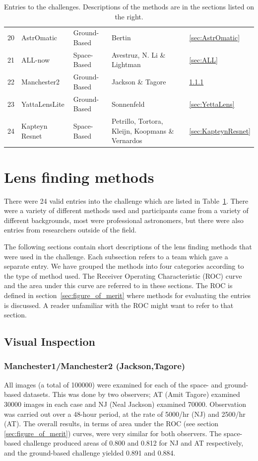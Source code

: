 \documentclass{aa}
\begin{document}
\begin{table}
\begin{tabular}{rllll}
  20 & AstrOmatic & Ground-Based & Bertin  & \ref{sec:AstrOmatic} \\ 
  21 & ALL-now & Space-Based & Avestruz, N. Li \& Lightman  & \ref{sec:ALL} \\ 
  22 & Manchester2 & Ground-Based & Jackson \& Tagore  & \ref{sec:manchester} \\ 
  23 & YattaLensLite & Ground-Based & Sonnenfeld  & \ref{sec:YettaLens} \\ 
  24 & Kapteyn Resnet & Space-Based & Petrillo, Tortora, Kleijn, Koopmans \& Vernardos & \ref{sec:KapteynResnet} \\ 
   \hline
\end{tabular}
\caption{Entries to the challenges.  Descriptions of the methods are in the sections listed on the right.}
\label{table:entries}
\end{table}

\section{Lens finding methods}
\label{sec:entries}

There were 24 valid entries into the challenge which are listed in Table~\ref{table:entries}.  There were a variety of different methods used and participants came from a variety of different backgrounds, most were professional astronomers, but there were also entries from researchers outside of the field.  

The following sections contain short descriptions of the lens finding methods that were used in 
the challenge.  Each subsection refers to a team which gave a separate entry.  We have grouped the 
methods into four categories according to the type of method used.   The Receiver Operating Characteristic (ROC) curve and the area under this curve are referred to in these sections.  The ROC is defined in section~\ref{sec:figure_of_merit} where methods for evaluating the entries is discussed.  A reader unfamiliar with the ROC might want to refer to that section.

\subsection{Visual Inspection}
\subsubsection{Manchester1/Manchester2 (Jackson,Tagore)}
\label{sec:manchester}

All images (a total of 100000) were examined for each of the space- and
ground-based datasets. This was done by two observers; AT (Amit Tagore) examined 30000
images in each case and NJ (Neal Jackson) examined 70000. Observation was carried out
over a 48-hour period, at the rate of 5000/hr (NJ) and 2500/hr (AT). 
The overall results, in terms of area under the ROC (see section \ref{sec:figure_of_merit}) curves, were very similar for 
both observers. The space-based challenge produced areas of 0.800 and 
0.812 for NJ and AT respectively, and the ground-based challenge yielded 
0.891 and 0.884.
\end{document}
